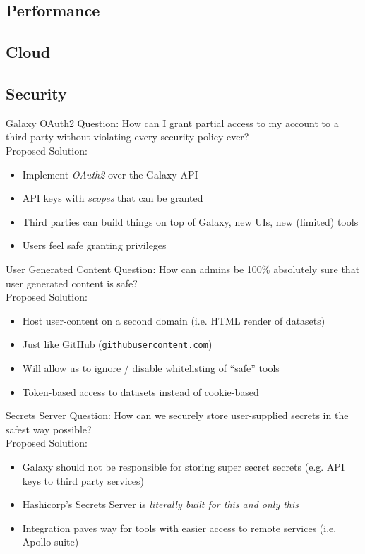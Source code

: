 \documentclass[12pt]{ufrslides}
\begin{document}
\subsection{Performance}

\subsection{Cloud}

\subsection{Security}

	\begin{frame}{Galaxy OAuth2}
		Question: How can I grant partial access to my account to a third party without violating every security policy ever? \\[0.6cm]
		Proposed Solution:
		\begin{itemize}
			\item Implement \emph{OAuth2} over the Galaxy API
			\item API keys with \emph{scopes} that can be granted
			\item Third parties can build things on top of Galaxy, new UIs, new (limited) tools
			\item Users feel safe granting privileges
		\end{itemize}
	\end{frame}

	\begin{frame}{User Generated Content}
		Question: How can admins be 100\% absolutely sure that user generated content is safe? \\[0.6cm]
		Proposed Solution:
		\begin{itemize}
			\item Host user-content on a second domain (i.e. HTML render of datasets)
			\item Just like GitHub (\texttt{githubusercontent.com})
			\item Will allow us to ignore / disable whitelisting of ``safe'' tools
			\item Token-based access to datasets instead of cookie-based
		\end{itemize}
	\end{frame}

	\begin{frame}{Secrets Server}
		Question: How can we securely store user-supplied secrets in the safest way possible? \\[0.6cm]
		Proposed Solution:
		\begin{itemize}
			\item Galaxy should not be responsible for storing super secret secrets (e.g. API keys to third party services)
			\item Hashicorp's Secrets Server is \emph{literally built for this and only this}
			\item Integration paves way for tools with easier access to remote services (i.e. Apollo suite)
		\end{itemize}
	\end{frame}
\end{document}
